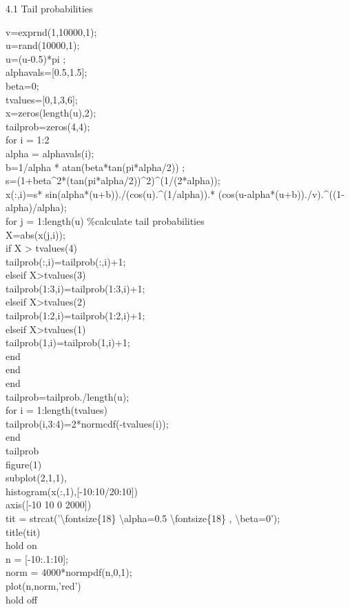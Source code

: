 \documentclass[twoside,twocolumn]{article}
\begin{document}
\begin{large}
4.1 Tail probabilities
\end{large}
\newline
\begin{itshape}
v=exprnd(1,10000,1);\\
u=rand(10000,1);\\
u=(u-0.5)*pi ;\\
alphavals=[0.5,1.5];\\
beta=0;\\
tvalues=[0,1,3,6];\\
x=zeros(length(u),2);\\
tailprob=zeros(4,4);\\

for i = 1:2\\
alpha = alphavals(i);\\
b=1/alpha * atan(beta*tan(pi*alpha/2)) ;\\
s=(1+beta\^{}2*(tan(pi*alpha/2))\^{}2)\^{}(1/(2*alpha));\\
x(:,i)=s* sin(alpha*(u+b))./(cos(u).\^{}(1/alpha)).* (cos(u-alpha*(u+b))./v).\^{}((1-alpha)/alpha); \\
for j = 1:length(u) \%calculate tail probabilities\\
   X=abs(x(j,i));\\
   if X > tvalues(4)\\
       tailprob(:,i)=tailprob(:,i)+1;\\
   elseif X>tvalues(3)\\
       tailprob(1:3,i)=tailprob(1:3,i)+1;\\
   elseif X>tvalues(2)\\
       tailprob(1:2,i)=tailprob(1:2,i)+1;\\
   elseif X>tvalues(1)\\
       tailprob(1,i)=tailprob(1,i)+1;\\
   end       \\
end\\
end\\
tailprob=tailprob./length(u);\\
for i = 1:length(tvalues)\\
   tailprob(i,3:4)=2*normcdf(-tvalues(i)); \\
end\\
tailprob\\

figure(1)\\

subplot(2,1,1),\\
histogram(x(:,1),[-10:10/20:10])\\
axis([-10 10 0 2000])\\
tit = strcat('\textbackslash fontsize\{18\} \textbackslash alpha=0.5 \textbackslash fontsize\{18\} , \textbackslash beta=0');\\
title(tit)\\
hold on\\
n = [-10:.1:10];\\
norm = 4000*normpdf(n,0,1);\\
plot(n,norm,'red')\\
hold off\\


\end{itshape}
\end{document}
